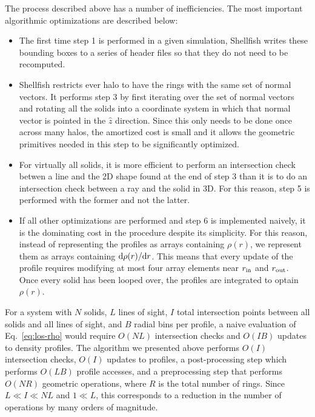 \documentclass[numberedappendix,apj]{emulateapj}
\begin{document}
The process described above has a number of inefficiencies. The most
important algorithmic optimizations are described below:
\begin{itemize}
        \item The first time step 1 is performed in a given simulation,
        Shellfish writes these bounding boxes to a series of header
        files so that they do not need to be recomputed. 
        \item Shellfish restricts ever halo to have the rings with the same
        set of normal vectors. It performs step 3 by first iterating over
        the set of normal vectors and rotating all the solids into a coordinate
        system in which that normal vector is pointed in the $\hat{z}$
        direction. Since this only needs to be done once across many halos, the
        amortized cost is small and it allows the geometric primitives needed
        in this step to be significantly optimized.
        \item For virtually all solids, it is more efficient to perform an
        intersection check betwen a line and the 2D shape found at the end of
        step 3 than it is to do an intersection check between a ray and the
        solid in 3D. For this reason, step 5 is performed with the former and
        not the latter.
        \item If all other optimizations are performed and step 6 is
        implemented naively, it is the dominating cost in the procedure despite
        its simplicity. For this reason, instead of representing the profiles
        as arrays containing $\rho(r)$, we represent them as arrays containing
        ${\rm d} \rho(r) / {\rm d} r$. This means that every update of the
        profile requires modifying at most four array elements near 
        $r_{\rm in}$ and $r_{\rm out}$. Once every solid has been looped over,
        the profiles are integrated to optain $\rho(r)$.
\end{itemize}

For a system with $N$ solids, $L$ lines of sight, $I$ total intersection points
between all solids and all lines of sight, and $B$ radial bins per profile, a
naive evaluation of Eq.~\ref{eq:los-rho} would require $O(NL)$ intersection
checks and $O(IB)$ updates to density profiles. The algorithm we presented above
performs $O(I)$ intersection checks, $O(I)$ updates to profiles, a
post-processing step which performs $O(LB)$ profile accesses, and a
preprocessing step that performs $O(NR)$ geometric operations, where $R$ is the
total number of rings. Since $L \ll I \ll NL$ and $1 \ll L$,
this corresponds to a reduction in the number of operations by many orders
of magnitude.
\end{document}
